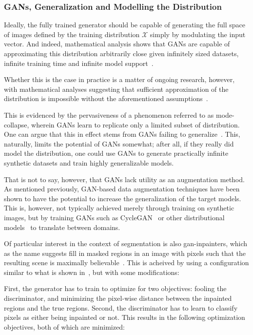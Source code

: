      \subsubsection{GANs, Generalization and Modelling the Distribution}
     Ideally, the fully trained generator should be capable of generating the full space of images defined by the training distribution \(\mathcal{X}\) simply by modulating the input vector. And indeed, mathematical analysis shows that GANs are capable of approximating this distribution arbitrarily close given infinitely sized datasets, infinite training time and infinite model support~\cite{gan_first}. 
     
     Whether this is the case in practice is a matter of ongoing research, however, with mathematical analyses suggesting that sufficient approximation of the distribution is impossible without the aforementioned assumptions~\cite{gan_learning_distribution}.
     
     This is evidenced by the pervasiveness of a phenomenon referred to as mode-collapse, wherein GANs learn to replicate only a limited subset of distribution. One can argue that this in effect stems from GANs failing to generalize~\cite{gan_gen}. This, naturally, limits the potential of GANs somewhat; after all, if they really did model the distribution, one could use GANs to generate practically infinite synthetic datasets and train highly generalizable models. 
     
     That is not to say, however, that GANs lack utility as an augmentation method. As mentioned previously, GAN-based data augmentation techniques have been shown to have the potential to increase the generalization of the target models. This is, however, not typically achieved merely through training on synthetic images, but by training GANs such as CycleGAN~\cite{cyclegan} or other distributional models~\cite{covid} to translate between domains. 
     
     Of particular interest in the context of segmentation is also \gls{gan}-inpainters, which as the name suggests fill in masked regions in an image with pixels such that the resulting scene is maximally believable~\cite{inpainter_basic}. This is acheived by using a configuration similar to what is shown in~, but with some modifications:
     
     First, the generator has to train to optimize for two objectives: fooling the discriminator, and minimizing the pixel-wise distance between the inpainted regions and the true regions. Second, the discriminator has to learn to classify pixels as either being inpainted or not. This results in the following optimization objectives, both of which are minimized:
     
